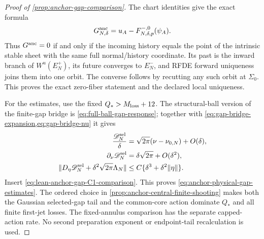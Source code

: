 \begin{proof}[Proof of \cref{prop:anchor-gap-comparison}]
The chart identities give the exact formula
\[
 G^{\rm anc}_{N,\delta}
 =u_A-F_{N,\delta,p}^{-,0}(\psi_A).
\]
Thus \(G^{\rm anc}=0\) if and only if the incoming history equals the
point of the intrinsic stable sheet with the same full normal/history
coordinate.  Its past is the inward branch of \(W^u(E_N^+)\), its future
converges to \(E_N^-\), and RFDE forward uniqueness joins them into one
orbit.  The converse follows by recutting any such orbit at \(\Sigma_0\).
This proves the exact zero-fiber statement and the declared local
uniqueness.

For the estimates, use the fixed \(Q_*>M_{\rm loss}+12\).  The
structural-ball version of the finite-gap bridge is
\cref{eq:full-ball-gap-response}; together with
\cref{eq:gap-bridge-expansion,eq:gap-bridge-nu} it gives
\begin{align*}
 \frac{\mathscr D_N^{\rm sel}}\delta
 &=\sqrt{2\pi}(\nu-\nu_{0,N})+O(\delta),\\
 \partial_\nu\mathscr D_N^{\rm sel}
 &=\delta\sqrt{2\pi}+O(\delta^2),\\
 \|D_\eta\mathscr D_N^{\rm sel}
       +\delta^2\sqrt{2\pi}\Lambda_N\|
 &\le C\{\delta^3+\delta^2\|\eta\|\}.
\end{align*}
Insert \cref{eq:lean-anchor-gap-C1-comparison}.  This proves
\cref{eq:anchor-physical-gap-estimates}.  The ordered choice in
\cref{prop:anchor-central-finite-shooting} makes both the Gaussian
selected-gap tail and the common-core action dominate \(Q_*\) and all finite
first-jet losses.  The fixed-annulus comparison has the separate
capped-action rate.  No second preparation exponent or endpoint-tail
recalculation is used.
\end{proof}

